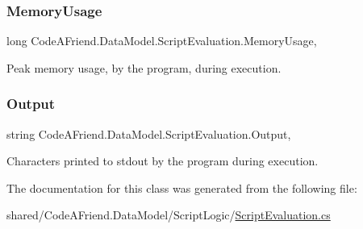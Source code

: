 \subsubsection{\texorpdfstring{Memory\+Usage}{MemoryUsage}}
{\footnotesize\ttfamily long Code\+A\+Friend.\+Data\+Model.\+Script\+Evaluation.\+Memory\+Usage\hspace{0.3cm}{\ttfamily [get]}, {\ttfamily [set]}}



Peak memory usage, by the program, during execution. 

\mbox{\label{class_code_a_friend_1_1_data_model_1_1_script_evaluation_ad90120cfe537b3a21bfc497d544eb0e9}} 
\subsubsection{\texorpdfstring{Output}{Output}}
{\footnotesize\ttfamily string Code\+A\+Friend.\+Data\+Model.\+Script\+Evaluation.\+Output\hspace{0.3cm}{\ttfamily [get]}, {\ttfamily [set]}}



Characters printed to stdout by the program during execution. 



The documentation for this class was generated from the following file\+:\begin{DoxyCompactItemize}
\item 
shared/\+Code\+A\+Friend.\+Data\+Model/\+Script\+Logic/\mbox{\hyperlink{_script_evaluation_8cs}{Script\+Evaluation.\+cs}}\end{DoxyCompactItemize}
